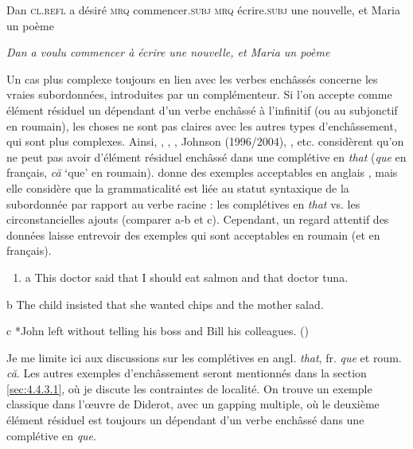 Dan \textsc{cl.refl} a désiré \textsc{mrq} commencer.\textsc{subj} \textsc{mrq} écrire.\textsc{subj} une nouvelle, et Maria un poème

{\itshape
Dan a voulu commencer à écrire une nouvelle, et Maria un poème}

Un cas plus complexe toujours en lien avec les verbes enchâssés concerne les vraies subordonnées, introduites par un complémenteur. Si l'on accepte comme élément résiduel un dépendant d'un verbe enchâssé à l'infinitif (ou au subjonctif en roumain), les choses ne sont pas claires avec les autres types d'enchâssement, qui sont plus complexes. Ainsi, \citet{Koutsoudas1971}, \citet{Hankamer1979}, \citet{Wilder1994}, Johnson (1996/2004), \citet{Williams1997}, etc. considèrent qu'on ne peut pas avoir d'élément résiduel enchâssé dans une complétive en \textit{that} (\textit{que} en français, \textit{că} `que' en roumain). \citet{Gardent1991} donne des exemples acceptables en anglais , mais elle considère que la grammaticalité est liée au statut syntaxique de la subordonnée par rapport au verbe racine : les complétives en \textit{that} vs. les circonstancielles ajouts (comparer a-b et c). Cependant, un regard attentif des données laisse entrevoir des exemples qui sont acceptables en roumain (et en français).  


\begin{enumerate}
\item \label{bkm:Ref288750752}a   This doctor said that I should eat salmon and that doctor tuna.


\end{enumerate}
  b  The child insisted that she wanted chips and the mother salad.

c  *John left without telling his boss and Bill his colleagues.  (\citet{Gardent1991})

Je me limite ici aux discussions sur les complétives en angl. \textit{that}, fr. \textit{que} et roum. \textit{că}. Les autres exemples d'enchâssement seront mentionnés dans la section \ref{sec:4.4.3.1}, où je discute les contraintes de localité. On trouve un exemple classique dans l'{\oe}uvre de Diderot, avec un gapping multiple, où le deuxième élément résiduel est toujours un dépendant d'un verbe enchâssé dans une complétive en \textit{que}. 


